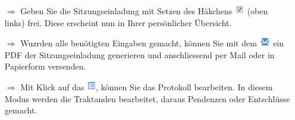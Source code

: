 \documentclass{article}
\begin{document}
\begin{multicols}{2}


\begin{tcolorbox}[colback=blue!5,colframe=blue!40!black,title=Eine Einladung bearbeiten / versenden]
\begin{itemize}
  \item[$\Longrightarrow$] Geben Sie die Sitzungseinladung mit Setzen des Häkchens \includegraphics[height=12pt]{Icons/sbox_ok.jpg} (oben links) frei. Diese erscheint nun in Ihrer persönlicher Übersicht.
  \item[$\Longrightarrow$] Wuzrden alle benötigten Eingaben gemacht, können Sie mit dem \includegraphics[height=12pt]{Icons/Briefsymbol.jpg} ein PDF der Sitzungseinladung generieren und anschliessend per Mail oder in Papierform versenden.
  \item[$\Longrightarrow$] Mit Klick auf das \includegraphics[height=12pt]{Icons/Listensymbol.jpg}, können Sie das Protokoll bearbeiten. In diesem Modus werden die Traktanden bearbeitet, daraus Pendenzen oder Entschlüsse gemacht.		
\end{itemize}
\end{tcolorbox}


\end{multicols}

\end{document}
